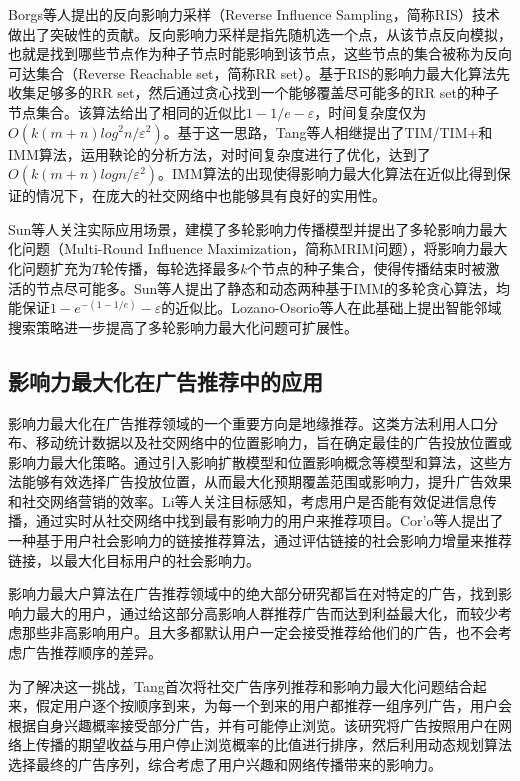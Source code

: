 Borgs等人\cite{borgs2014maximizing}提出的反向影响力采样（Reverse Influence Sampling，简称RIS）技术做出了突破性的贡献。反向影响力采样是指先随机选一个点，从该节点反向模拟，也就是找到哪些节点作为种子节点时能影响到该节点，这些节点的集合被称为反向可达集合（Reverse Reachable set，简称RR set）。基于RIS的影响力最大化算法先收集足够多的RR set，然后通过贪心找到一个能够覆盖尽可能多的RR set的种子节点集合。该算法给出了相同的近似比$1-1/e-\varepsilon$，时间复杂度仅为$O(k(m+n)log^2n/\varepsilon^2)$。基于这一思路，Tang等人相继提出了TIM/TIM+\cite{tang2014influence}和IMM\cite{tang2015influence}算法，运用鞅论的分析方法，对时间复杂度进行了优化，达到了$O(k(m+n)logn/\varepsilon^2)$。IMM算法的出现使得影响力最大化算法在近似比得到保证的情况下，在庞大的社交网络中也能够具有良好的实用性。

Sun等人关注实际应用场景，建模了多轮影响力传播模型并提出了多轮影响力最大化问题（Multi-Round Influence Maximization，简称MRIM问题）\parencite{sun2018multi}，将影响力最大化问题扩充为$T$轮传播，每轮选择最多$k$个节点的种子集合，使得传播结束时被激活的节点尽可能多。Sun等人提出了静态和动态两种基于IMM的多轮贪心算法，均能保证$1-e^{-(1-1/e)}-\varepsilon$的近似比。Lozano-Osorio等人\cite{lozano2022multi}在此基础上提出智能邻域搜索策略进一步提高了多轮影响力最大化问题可扩展性。


\subsection{影响力最大化在广告推荐中的应用}

影响力最大化在广告推荐领域的一个重要方向是地缘推荐\cite{zhang2020geodemographic,zeng2021business,saleem2019effective}。这类方法利用人口分布、移动统计数据以及社交网络中的位置影响力，旨在确定最佳的广告投放位置或影响力最大化策略。通过引入影响扩散模型和位置影响概念等模型和算法，这些方法能够有效选择广告投放位置，从而最大化预期覆盖范围或影响力，提升广告效果和社交网络营销的效率。Li等人\cite{li2015real}关注目标感知，考虑用户是否能有效促进信息传播，通过实时从社交网络中找到最有影响力的用户来推荐项目。Cor{'o}等人\cite{coro2021link}提出了一种基于用户社会影响力的链接推荐算法，通过评估链接的社会影响力增量来推荐链接，以最大化目标用户的社会影响力。

影响力最大户算法在广告推荐领域中的绝大部分研究都旨在对特定的广告，找到影响力最大的用户，通过给这部分高影响人群推荐广告而达到利益最大化，而较少考虑那些非高影响用户。且大多都默认用户一定会接受推荐给他们的广告，也不会考虑广告推荐顺序的差异。

为了解决这一挑战，Tang\cite{tang2018social}首次将社交广告序列推荐和影响力最大化问题结合起来，假定用户逐个按顺序到来，为每一个到来的用户都推荐一组序列广告，用户会根据自身兴趣概率接受部分广告，并有可能停止浏览。该研究将广告按照用户在网络上传播的期望收益与用户停止浏览概率的比值进行排序，然后利用动态规划算法选择最终的广告序列，综合考虑了用户兴趣和网络传播带来的影响力。

